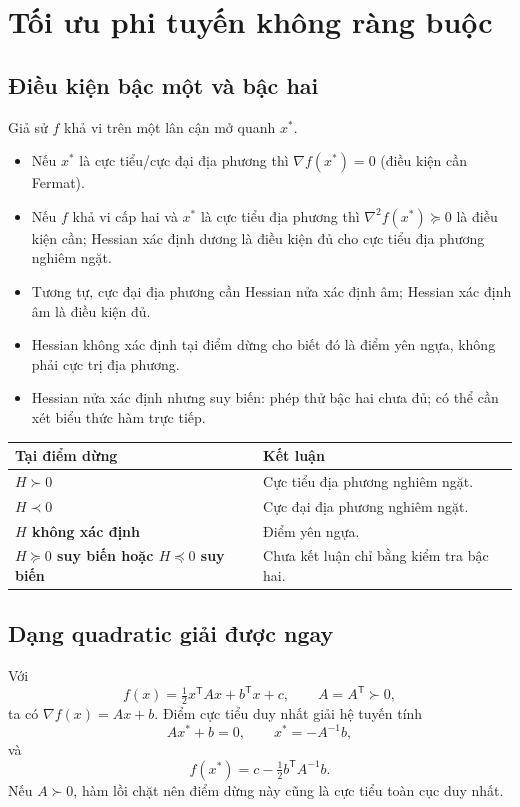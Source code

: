 \documentclass[11pt,a4paper]{article}
\newcommand{\grad}{\nabla}
\newcommand{\Hess}{\nabla^2}
\newcommand{\T}{^{\mathsf T}}
\begin{document}
\section{Tối ưu phi tuyến không ràng buộc}
\subsection{Điều kiện bậc một và bậc hai}
Giả sử \(f\) khả vi trên một lân cận mở quanh \(x^\ast\).
\begin{itemize}
\item Nếu \(x^\ast\) là cực tiểu/cực đại địa phương thì \(\grad f(x^\ast)=0\) (điều kiện cần Fermat).
\item Nếu \(f\) khả vi cấp hai và \(x^\ast\) là cực tiểu địa phương thì \(\Hess f(x^\ast)\succeq0\) là điều kiện cần; Hessian xác định dương là điều kiện đủ cho cực tiểu địa phương nghiêm ngặt.
\item Tương tự, cực đại địa phương cần Hessian nửa xác định âm; Hessian xác định âm là điều kiện đủ.
\item Hessian không xác định tại điểm dừng cho biết đó là điểm yên ngựa, không phải cực trị địa phương.
\item Hessian nửa xác định nhưng suy biến: phép thử bậc hai chưa đủ; có thể cần xét biểu thức hàm trực tiếp.
\end{itemize}

\begin{center}
\begin{tabularx}{.9\textwidth}{>{\bfseries}p{}Y}
\toprule
Tại điểm dừng & Kết luận\\
\midrule
\(H\succ0\) & Cực tiểu địa phương nghiêm ngặt.\\
\(H\prec0\) & Cực đại địa phương nghiêm ngặt.\\
\(H\) không xác định & Điểm yên ngựa.\\
\(H\succeq0\) suy biến hoặc \(H\preceq0\) suy biến & Chưa kết luận chỉ bằng kiểm tra bậc hai.\\
\bottomrule
\end{tabularx}
\end{center}

\subsection{Dạng quadratic giải được ngay}
Với
\[
f(x)=\tfrac12x\T Ax+b\T x+c,\qquad A=A\T\succ0,
\]
ta có \(\grad f(x)=Ax+b\). Điểm cực tiểu duy nhất giải hệ tuyến tính
\[
Ax^\ast+b=0,\qquad x^\ast=-A^{-1}b,
\]
và
\[
f(x^\ast)=c-\tfrac12b\T A^{-1}b.
\]
Nếu \(A\succ0\), hàm lồi chặt nên điểm dừng này cũng là cực tiểu toàn cục duy nhất.
\end{document}

